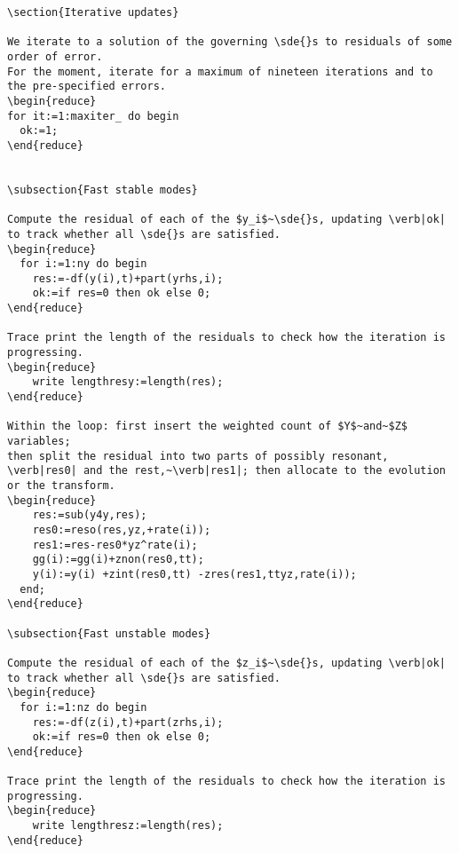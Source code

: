 \documentclass[11pt,a5paper]{article}
\begin{document}
\begin{reduce}
\begin{verbatim}
\section{Iterative updates}

We iterate to a solution of the governing \sde{}s to residuals of some order of error.
For the moment, iterate for a maximum of nineteen iterations and to the pre-specified errors.
\begin{reduce}
for it:=1:maxiter_ do begin
  ok:=1;
\end{reduce}


\subsection{Fast stable modes}

Compute the residual of each of the $y_i$~\sde{}s, updating \verb|ok| to track whether all \sde{}s are satisfied.
\begin{reduce}
  for i:=1:ny do begin  
    res:=-df(y(i),t)+part(yrhs,i);
    ok:=if res=0 then ok else 0;
\end{reduce}

Trace print the length of the residuals to check how the iteration is progressing.
\begin{reduce}
    write lengthresy:=length(res);
\end{reduce}

Within the loop: first insert the weighted count of $Y$~and~$Z$ variables;
then split the residual into two parts of possibly resonant, \verb|res0| and the rest,~\verb|res1|; then allocate to the evolution or the transform.
\begin{reduce}
    res:=sub(y4y,res);
    res0:=reso(res,yz,+rate(i));
    res1:=res-res0*yz^rate(i);
    gg(i):=gg(i)+znon(res0,tt);
    y(i):=y(i) +zint(res0,tt) -zres(res1,ttyz,rate(i));
  end;
\end{reduce}

\subsection{Fast unstable modes}

Compute the residual of each of the $z_i$~\sde{}s, updating \verb|ok| to track whether all \sde{}s are satisfied.
\begin{reduce}
  for i:=1:nz do begin  
    res:=-df(z(i),t)+part(zrhs,i);
    ok:=if res=0 then ok else 0;
\end{reduce}

Trace print the length of the residuals to check how the iteration is progressing.
\begin{reduce}
    write lengthresz:=length(res);
\end{reduce}


\end{verbatim}
\end{reduce}
\end{document}
